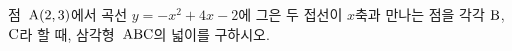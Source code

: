 점~$\mathrm{A}(2{,}\mkern3mu\mathopen{}3)$에서 곡선 $y=-x^2+4x-2$에 그은 두 접선이 $x$축과 만나는 점을 각각 $\mathrm{B}$, $\mathrm{C}$라 할 때, 삼각형~$\mathrm{ABC}$의 넓이를 구하시오.
